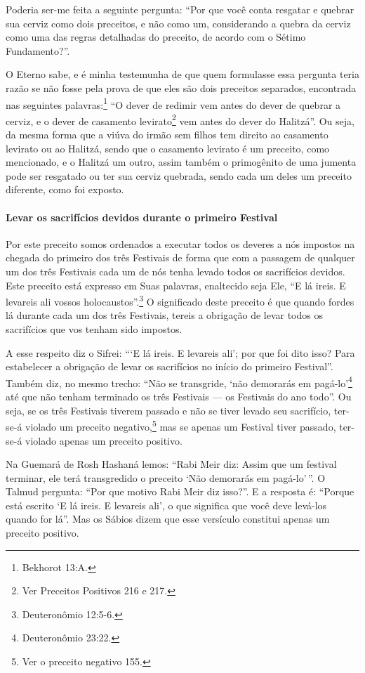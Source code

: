 Poderia ser-me feita a seguinte pergunta: ``Por que você conta resgatar
e quebrar sua cerviz como dois preceitos, e não como um, considerando a
quebra da cerviz como uma das regras detalhadas do preceito, de acordo
com o Sétimo Fundamento?''.

O Eterno sabe, e é minha testemunha de que quem formulasse essa pergunta
teria razão se não fosse pela prova de que eles são dois preceitos
separados, encontrada nas seguintes palavras:\footnote{Bekhorot 13:A.} ``O
dever de redimir vem antes do dever de quebrar a cerviz, e o dever de
casamento levirato\footnote{Ver Preceitos Positivos 216 e 217.} vem antes do dever do
Halitzá''. Ou seja, da mesma forma que a viúva
do irmão sem filhos tem direito ao casamento levirato ou ao Halitzá,
sendo que o casamento levirato é um preceito, como mencionado, e o
Halitzá um outro, assim também o primogênito de uma jumenta pode ser
resgatado ou ter sua cerviz quebrada, sendo cada um deles um preceito
diferente, como foi exposto.

\paragraph{Levar os sacrifícios devidos durante o primeiro Festival}

Por este preceito somos ordenados a executar todos os deveres a nós
impostos na chegada do primeiro dos três Festivais de forma que com a
passagem de qualquer um dos três Festivais cada um de nós tenha levado
todos os
sacrifícios devidos. Este preceito está expresso em Suas palavras,
enaltecido seja
Ele, ``E lá ireis. E levareis ali vossos holocaustos''.\footnote{Deuteronômio
12:5-6.} O significado deste preceito é que quando fordes lá durante
cada um dos três Festivais, tereis a obrigação de levar todos os
sacrifícios que vos tenham sido impostos.

A esse respeito diz o Sifrei: ```E lá ireis. E levareis ali'; por que
foi dito isso? Para estabelecer a obrigação de levar os sacrifícios no
início do primeiro Festival''. Também diz, no mesmo trecho: ``Não se
transgride, `não demorarás em pagá-lo'\footnote{Deuteronômio 23:22.} até que não
tenham terminado os três Festivais --- os Festivais do ano todo''. Ou seja, se os três
Festivais tiverem passado e não se tiver levado seu sacrifício, ter-se-á violado um
preceito negativo,\footnote{Ver o preceito negativo 155.} mas se apenas um Festival tiver passado,
ter-se-á violado apenas um preceito positivo.

Na Guemará de Rosh Hashaná lemos: ``Rabi Meir diz: Assim que um festival
terminar, ele terá transgredido o preceito `Não demorarás em pagá-lo'\,''.
O Talmud pergunta: ``Por que motivo Rabi Meir diz isso?''. E a resposta
é: ``Porque está escrito `E lá ireis. E levareis ali', o que significa
que você deve levá-los quando for lá''. Mas os Sábios dizem que esse
versículo constitui apenas um preceito positivo.

